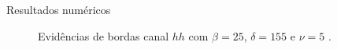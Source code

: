 \documentclass[10pt]{beamer}
\begin{document}
\begin{frame}{Resultados numéricos}
\begin{figure}[hbt]
	\caption{Evidências de bordas canal $hh$ com $\beta = 25$, $\delta = 155$ e $\nu = 5$ .}
\endminipage\hfill
\end{figure}
\end{frame}
\end{document}
